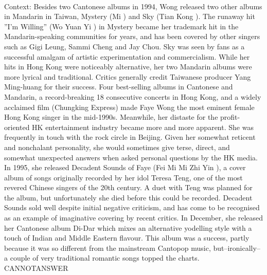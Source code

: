 \documentclass[11pt,a4paper, onecolumn]{article}
\begin{document}
\\ Context: Besides two Cantonese albums in 1994, Wong released two other albums in Mandarin in Taiwan, Mystery (Mi ) and Sky (Tian Kong ). The runaway hit ''I'm Willing'' (Wo Yuan Yi ) in Mystery became her trademark hit in the Mandarin-speaking communities for years, and has been covered by other singers such as Gigi Leung, Sammi Cheng and Jay Chou. Sky was seen by fans as a successful amalgam of artistic experimentation and commercialism. While her hits in Hong Kong were noticeably alternative, her two Mandarin albums were more lyrical and traditional. Critics generally credit Taiwanese producer Yang Ming-huang for their success. Four best-selling albums in Cantonese and Mandarin, a record-breaking 18 consecutive concerts in Hong Kong, and a widely acclaimed film (Chungking Express) made Faye Wong the most eminent female Hong Kong singer in the mid-1990s. Meanwhile, her distaste for the profit-oriented HK entertainment industry became more and more apparent. She was frequently in touch with the rock circle in Beijing. Given her somewhat reticent and nonchalant personality, she would sometimes give terse, direct, and somewhat unexpected answers when asked personal questions by the HK media. In 1995, she released Decadent Sounds of Faye (Fei Mi Mi Zhi Yin ), a cover album of songs originally recorded by her idol Teresa Teng, one of the most revered Chinese singers of the 20th century. A duet with Teng was planned for the album, but unfortunately she died before this could be recorded. Decadent Sounds sold well despite initial negative criticism, and has come to be recognised as an example of imaginative covering by recent critics. In December, she released her Cantonese album Di-Dar which mixes an alternative yodelling style with a touch of Indian and Middle Eastern flavour. This album was a success, partly because it was so different from the mainstream Cantopop music, but--ironically--a couple of very traditional romantic songs topped the charts. CANNOTANSWER
\end{document}
